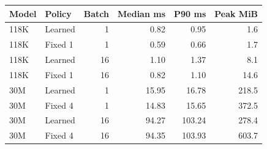 \begin{center}\small\begin{tabular}{llrrrr}\toprule
Model & Policy & Batch & Median ms & P90 ms & Peak MiB\\\midrule
118K & Learned & 1 & 0.82 & 0.95 & 1.6 \\
118K & Fixed 1 & 1 & 0.59 & 0.66 & 1.7 \\
118K & Learned & 16 & 1.10 & 1.37 & 8.1 \\
118K & Fixed 1 & 16 & 0.82 & 1.10 & 14.6 \\
30M & Learned & 1 & 15.95 & 16.78 & 218.5 \\
30M & Fixed 4 & 1 & 14.83 & 15.65 & 372.5 \\
30M & Learned & 16 & 94.27 & 103.24 & 278.4 \\
30M & Fixed 4 & 16 & 94.35 & 103.93 & 603.7 \\
\bottomrule\end{tabular}\end{center}
